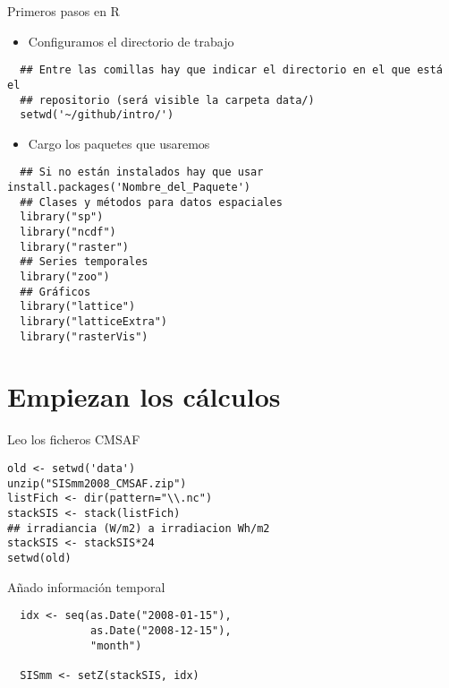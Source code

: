 \documentclass[xcolor={usenames,svgnames,dvipsnames}]{beamer}
\begin{document}
\begin{frame}[fragile,label=sec-1-3]{Primeros pasos en R}
 \begin{itemize}
\item Configuramos el directorio de trabajo
\end{itemize}
\lstset{language=R,label= ,caption= ,numbers=none}
\begin{lstlisting}
  ## Entre las comillas hay que indicar el directorio en el que está el
  ## repositorio (será visible la carpeta data/)
  setwd('~/github/intro/')
\end{lstlisting}
\begin{itemize}
\item Cargo los paquetes que usaremos
\end{itemize}
\lstset{language=R,label= ,caption= ,numbers=none}
\begin{lstlisting}
  ## Si no están instalados hay que usar install.packages('Nombre_del_Paquete')
  ## Clases y métodos para datos espaciales
  library("sp")
  library("ncdf")
  library("raster")
  ## Series temporales
  library("zoo")
  ## Gráficos
  library("lattice")
  library("latticeExtra")
  library("rasterVis")
\end{lstlisting}
\end{frame}

\section{Empiezan los cálculos}
\label{sec-2}

\begin{frame}[fragile,label=sec-2-1]{Leo los ficheros CMSAF}
 \lstset{language=R,label= ,caption= ,numbers=none}
\begin{lstlisting}
old <- setwd('data')
unzip("SISmm2008_CMSAF.zip")
listFich <- dir(pattern="\\.nc")
stackSIS <- stack(listFich)
## irradiancia (W/m2) a irradiacion Wh/m2
stackSIS <- stackSIS*24
setwd(old)
\end{lstlisting}
\end{frame}

\begin{frame}[fragile,label=sec-2-2]{Añado información temporal}
 \lstset{language=R,label= ,caption= ,numbers=none}
\begin{lstlisting}
  idx <- seq(as.Date("2008-01-15"),
             as.Date("2008-12-15"),
             "month")
  
  SISmm <- setZ(stackSIS, idx)
\end{lstlisting}
\end{frame}
\end{document}
